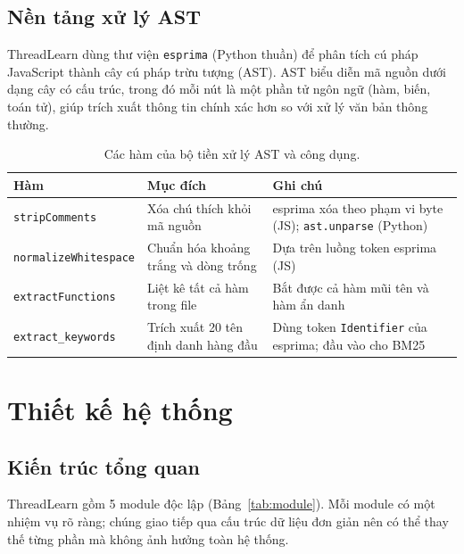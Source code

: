 \documentclass[12pt]{article}
\begin{document}
\subsection{Nền tảng xử lý AST}

ThreadLearn dùng thư viện \texttt{esprima} (Python thuần) để phân tích cú pháp
JavaScript thành cây cú pháp trừu tượng (AST).
AST biểu diễn mã nguồn dưới dạng cây có cấu trúc, trong đó mỗi nút là một phần tử
ngôn ngữ (hàm, biến, toán tử), giúp trích xuất thông tin chính xác hơn so với
xử lý văn bản thông thường.

\begin{table}[ht]
  \centering
  \caption{Các hàm của bộ tiền xử lý AST và công dụng.}
  \label{tab:ast}
  \begin{tabular}{@{}llp{6.5cm}@{}}
    \toprule
    \textbf{Hàm} & \textbf{Mục đích} & \textbf{Ghi chú} \\
    \midrule
    \texttt{stripComments}       & Xóa chú thích khỏi mã nguồn    & esprima xóa theo phạm vi byte (JS); \texttt{ast.unparse} (Python) \\
    \texttt{normalizeWhitespace} & Chuẩn hóa khoảng trắng và dòng trống & Dựa trên luồng token esprima (JS) \\
    \texttt{extractFunctions}    & Liệt kê tất cả hàm trong file  & Bắt được cả hàm mũi tên và hàm ẩn danh \\
    \texttt{extract\_keywords}   & Trích xuất 20 tên định danh hàng đầu & Dùng token \texttt{Identifier} của esprima; đầu vào cho BM25 \\
    \bottomrule
  \end{tabular}
\end{table}

\section{Thiết kế hệ thống}
\label{sec:thietke}

\subsection{Kiến trúc tổng quan}

ThreadLearn gồm 5 module độc lập (Bảng~\ref{tab:module}).
Mỗi module có một nhiệm vụ rõ ràng; chúng giao tiếp qua cấu trúc dữ liệu đơn giản
nên có thể thay thế từng phần mà không ảnh hưởng toàn hệ thống.
\end{document}

